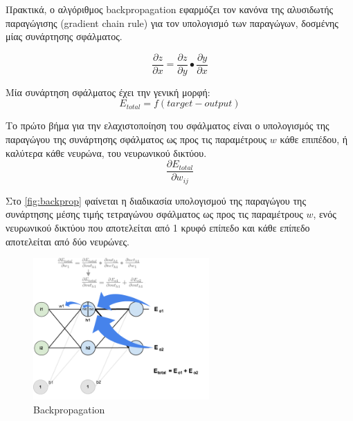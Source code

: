 Πρακτικά, ο αλγόριθμος backpropagation εφαρμόζει τον κανόνα
της αλυσιδωτής παραγώγισης (gradient chain rule) για τον υπολογισμό των
παραγώγων, δοσμένης μίας συνάρτησης σφάλματος.

\begin{equation*}
  \frac{\partial z}{\partial x} = \frac{\partial z}{\partial y}\bullet\frac{\partial y}{\partial x}
\end{equation*}


Μία συνάρτηση σφάλματος έχει την γενική μορφή:
\[
  E_{total} = f(target - output)
\]

Το πρώτο βήμα για την ελαχιστοποίηση του σφάλματος είναι ο υπολογισμός
της παραγώγου της συνάρτησης σφάλματος ως προς τις παραμέτρους $w$ κάθε επιπέδου,
ή καλύτερα κάθε νευρώνα, του νευρωνικού δικτύου.
\begin{equation*}
  \frac{\partial E_{total}}{\partial w_{ij}}
\end{equation*}

Στο \autoref{fig:backprop} φαίνεται η διαδικασία υπολογισμού της παραγώγου της συνάρτησης
μέσης τιμής τετραγώνου σφάλματος ως προς τις παραμέτρους $w$,
ενός νευρωνικού δικτύου που αποτελείται από 1 κρυφό επίπεδο και κάθε επίπεδο
αποτελείται από δύο νευρώνες.

\begin{figure}[!ht]
  \centering
  \hspace*{2cm} 
  \includegraphics[width=0.6\textwidth]{./images/chapter3/backprop.png}
  \caption[Backpropagation]{Backpropagation}
  \label{fig:backprop}
\end{figure}

